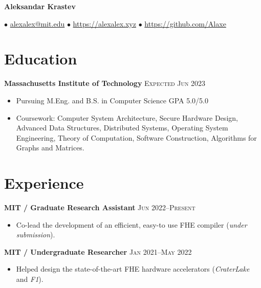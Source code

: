 \documentclass[letterpaper,11pt]{article}
\author{Aleksandar Krastev}
\begin{document}
\setlength{\belowdisplayskip}{\parskip}
\setlength{\belowdisplayshortskip}{\belowdisplayskip}
\setlength{\abovedisplayskip}{\parskip}
\setlength{\abovedisplayshortskip}{\abovedisplayskip}

\begin{center}
    \Huge \bf Aleksandar Krastev
\end{center}

\vspace{-\parskip}
$\bullet$ \href{mailto:alexalex@mit.edu}{alexalex@mit.edu} \hfill
$\bullet$ \href{https://alexalex.xyz}{https://alexalex.xyz} \hfill
$\bullet$ \href{https://github.com/Alaxe}{https://github.com/Alaxe} \hfill

\section*{Education}
\textbf{Massachusetts Institute of Technology}
\hfill
\textsc{Expected Jun 2023}

\begin{itemize}
    \item Pursuing M.Eng. and B.S. in Computer Science
        \hfill \textsc{GPA 5.0/5.0}
    \item Coursework:
        Computer System Architecture,
        Secure Hardware Design,
        Advanced Data Structures,
        Distributed Systems,
        Operating System Engineering,
        Theory of Computation,
        Software Construction,
        Algorithms for Graphs and Matrices.
\end{itemize}



\section*{Experience}
\textbf{MIT / Graduate Research Assistant}
\hfill
\textsc{Jun 2022--Present}
\begin{itemize}
    \item Co-lead the development of an efficient, easy-to use FHE compiler
        (\emph{under submission}).
\end{itemize}

\textbf{MIT / Undergraduate Researcher}
\hfill
\textsc{Jan 2021--May 2022}
\begin{itemize}
    \item Helped design the state-of-the-art FHE hardware accelerators
        (\emph{CraterLake} and \emph{F1}).
\end{itemize}
\end{document}
